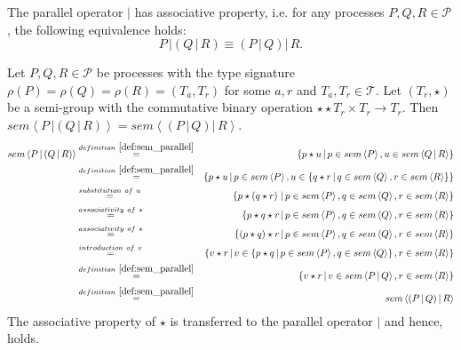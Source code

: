 \begin{theorem}
\label{thm:associativity_parallel}
The parallel operator $|$ has associative property, i.e. for any processes $P, Q, R \in \mathcal{P}$, the following equivalence holds:
\begin{equation*}
  P \,| \left( Q \,|\, R \right) \equiv \left( P \,|\, Q \right) |\, R.
\end{equation*}
\end{theorem}

\begin{myproof}
Let $P, Q, R \in \mathcal{P}$ be processes with the type signature $\rho \left( P \right) = \rho \left( Q \right) = \rho \left( R \right) = \left( T_a, T_r \right)$ for some $a, r$ and $T_a, T_r \in \mathcal{T}$. Let $\left( T_r, \star \right)$ be a semi-group with the commutative binary operation $\star \star T_r \times T_r \to T_r$. Then $sem \left\langle P \,| \left( Q \,|\, R \right) \right\rangle = sem \left\langle \left( P \,|\, Q \right) |\, R \right\rangle$.
\begin{eqnarray*}
  sem \left\langle P \,| \left( Q \,|\, R \right) \right\rangle & \overset{\defref{def:sem_parallel}}{=} & \left\{ p \star u \,|\, p \in sem \left\langle P \right\rangle, u \in sem \left\langle Q \,|\, R \right\rangle \right\} \\
  & \overset{\defref{def:sem_parallel}}{=} & \left\{ p \star u \,|\, p \in sem \left\langle P \right\rangle, u \in \left\{q \star r \,|\, q \in sem \left\langle Q \right\rangle, r \in sem \left\langle R \right\rangle \right\} \right\} \\
  & \overset{substitution \ of \ u}{=} & \left\{ p \star \left( q \star r \right) \,|\, p \in sem \left\langle P \right\rangle, q \in sem \left\langle Q \right\rangle, r \in sem \left\langle R \right\rangle \right\} \\
  & \overset{associativity \ of \  \star}{=} & \left\{ p \star q \star r \,|\, p \in sem \left\langle P \right\rangle, q \in sem \left\langle Q \right\rangle, r \in sem \left\langle R \right\rangle \right\} \\
  & \overset{associativity \ of \  \star}{=} & \left\{ \left( p \star q \right) \star r \,|\, p \in sem \left\langle P \right\rangle, q \in sem \left\langle Q \right\rangle, r \in sem \left\langle R \right\rangle \right\} \\
  & \overset{introduction \ of \ v}{=} & \left\{ v \star r \,|\, v \in \left\{ p \star q \,|\, p \in sem \left\langle P \right\rangle, q \in sem \left\langle Q \right\rangle \right\}, r \in sem \left\langle R \right\rangle \right\} \\
  & \overset{\defref{def:sem_parallel}}{=} & \left\{ v \star r \,|\, v \in sem \left\langle P \,|\, Q \right\rangle, r \in sem \left\langle R \right\rangle \right\} \\
  & \overset{\defref{def:sem_parallel}}{=} & sem \left\langle \left( P \,|\, Q \right) |\, R \right\rangle
\end{eqnarray*}
The associative property of $\star$ is transferred to the parallel operator $|$ and hence,  holds.


\end{myproof}
